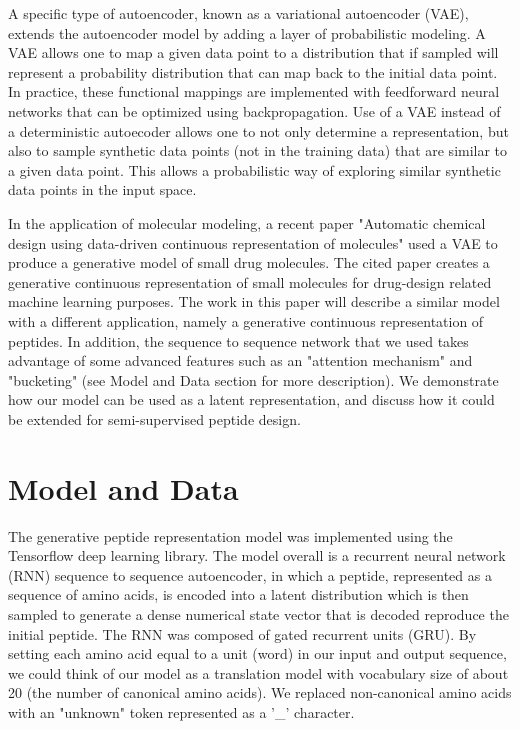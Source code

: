 \documentclass[final,1p,times]{elsarticle}
\begin{document}
A specific type of autoencoder, known as a variational autoencoder (VAE), extends the autoencoder model by adding a layer of probabilistic modeling\cite{kingma2013auto}. A VAE allows one to map a given data point to a distribution that if sampled will represent a probability distribution that can map back to the initial data point. In practice, these functional mappings are implemented with feedforward neural networks that can be optimized using backpropagation. Use of a VAE instead of a deterministic autoecoder allows one to not only determine a representation, but also to sample synthetic data points (not in the training data) that are similar to a given data point. This allows a probabilistic way of exploring similar synthetic data points in the input space.

In the application of molecular modeling, a recent paper "Automatic chemical design using data-driven continuous representation of molecules"\cite{gomez2016automatic} used a VAE to produce a generative model of small drug molecules. The cited paper creates a generative continuous representation of small molecules for drug-design related machine learning purposes. The work in this paper will describe a similar model with a different application, namely a generative continuous representation of peptides. In addition, the sequence to sequence network that we used takes advantage of some advanced features such as an "attention mechanism" and "bucketing" (see Model and Data section for more description). We demonstrate how our model can be used as a latent representation, and discuss how it could be extended for semi-supervised peptide design.

\section{Model and Data}

The generative peptide representation model was implemented using the Tensorflow deep learning library\cite{tensorflow2015-whitepaper}. The model overall is a recurrent neural network (RNN) sequence to sequence autoencoder, in which a peptide, represented as a sequence of amino acids, is encoded into a latent distribution which is then sampled to generate a dense numerical state vector that is decoded reproduce the initial peptide. The RNN was composed of gated recurrent units (GRU)\cite{chung2014empirical}. By setting each amino acid equal to a unit (word) in our input and output sequence, we could think of our model as a translation model with vocabulary size of about 20 (the number of canonical amino acids). We replaced non-canonical amino acids with an "unknown" token represented as a '\_' character.
\end{document}
